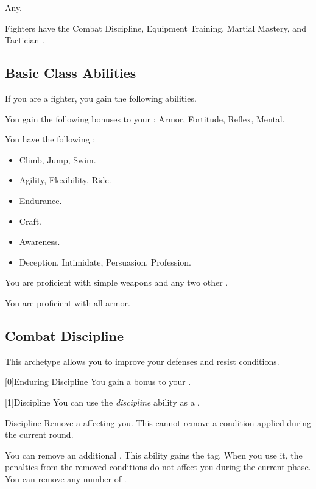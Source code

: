      Any.

     Fighters have the Combat Discipline, Equipment Training, Martial Mastery, and Tactician .

    \subsection{Basic Class Abilities}
        If you are a fighter, you gain the following abilities.

        You gain the following bonuses to your :  Armor,  Fortitude,  Reflex,  Mental.

        You have the following :
        \begin{itemize}
            \item {} Climb, Jump, Swim.
            \item {} Agility, Flexibility, Ride.
            \item {} Endurance.
            \item {} Craft.
            \item {} Awareness.
            \item {} Deception, Intimidate, Persuasion, Profession.
        \end{itemize}

        You are proficient with simple weapons and any two other .

        You are proficient with all armor.

    \newpage
    \subsection{Combat Discipline}
        This archetype allows you to improve your defenses and resist conditions.

        [0]{Enduring Discipline} You gain a  bonus to your .

        [1]{Discipline} You can use the \textit{discipline} ability as a .
        \begin{freeability}{Discipline}
            Remove a  affecting you.
            This cannot remove a condition applied during the current round.

            \rankline
             You can remove an additional .
             This ability gains the  tag.
            When you use it, the penalties from the removed conditions do not affect you during the current phase.
             You can remove any number of .
        \end{freeability}

